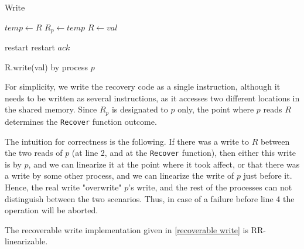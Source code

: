 \begin{algorithm}
	\caption{Write}\label{recoverable write}
	\begin{algorithmic}[1]	
		\State $temp \gets R$
		\State $R_p \gets temp$
		\State $R \gets val$
		\EndProcedure
		
		 \Return restart
		\EndIf
		 \Return restart
		\EndIf
		\State \Return $ack$
		\EndProcedure
	\end{algorithmic}
	\caption{R.write(val) by process $p$}
\end{algorithm}

For simplicity, we write the recovery code as a single instruction, although it needs to be written as several instructions, as it accesses two different locations in the shared memory. Since $R_p$ is designated to $p$ only, the point where $p$ reads $R$ determines the \texttt{Recover} function outcome.

The intuition for correctness is the following. If there was a write to $R$ between the two reads of $p$ (at line 2, and at the \texttt{Recover} function), then either this write is by $p$, and we can linearize it at the point where it took affect, or that there was a write by some other process, and we can linearize the write of $p$ just before it. Hence, the real write "overwrite" $p$'s write, and the rest of the processes can not distinguish between the two scenarios. Thus, in case of a failure before line 4 the operation will be aborted.

\begin{claim}
	The recoverable write implementation given in \ref{recoverable write} is RR-linearizable.
\end{claim}

